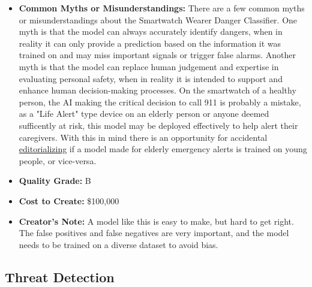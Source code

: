 \begin{itemize}
    \item \textbf{Common Myths or Misunderstandings:} There are a few common myths or misunderstandings about the Smartwatch Wearer Danger Classifier. One myth is that the model can always accurately identify dangers, when in reality it can only provide a prediction based on the information it was trained on and may miss important signals or trigger false alarms. Another myth is that the model can replace human judgement and expertise in evaluating personal safety, when in reality it is intended to support and enhance human decision-making processes. On the smartwatch of a healthy person, the AI making the critical decision to call 911 is probably a mistake, as a "Life Alert" type device on an elderly person or anyone deemed sufficently at risk, this model may be deployed effectively to help alert their caregivers. With this in mind there is an opportunity for accidental \hyperref[sec:janitor]{editorializing} if a model made for elderly emergency alerts is trained on young people, or vice-versa.
    \item \textbf{Quality Grade:} B
    \item \textbf{Cost to Create:} \$100,000
    \item \textbf{Creator's Note:} A model like this is easy to make, but hard to get right. The false positives and false negatives are very important, and the model needs to be trained on a diverse dataset to avoid bias. 
\end{itemize}

\subsection{Threat Detection}

